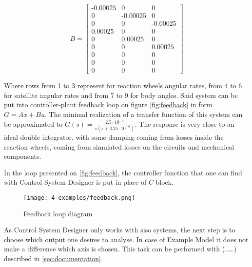         \small
        \begin{equation}
            B = 
            \begin{bmatrix}
                \text{-}0.00025  &           0 &            0 \\
                       0  &     \text{-}0.00025 &            0 \\
                       0  &           0 &      \text{-}0.00025 \\
                 0.00025  &           0 &            0 \\
                       0  &     0.00025 &            0 \\
                       0  &           0 &      0.00025 \\
                       0  &           0 &            0 \\
                       0  &           0 &            0 \\
                       0  &           0 &            0
            \end{bmatrix}
        \end{equation}
        \normalsize
    
        Where rows from 1 to 3 represent for reaction wheels angular rates, from 4 to 6 for satellite angular rates and from 7 to 9 for body angles. Said system can be put into controller-plant feedback loop on figure \autoref{fig:feedback} in form $G = Ax + Bu$. The minimal realization of a transfer function of this system can be approximated to $G(s) = \frac{2.5\cdot10^{-4}}{s(s+3.25\cdot10^{-6})}$. The response is very close to an ideal double integrator, with some damping coming from losses inside the reaction wheels, coming from simulated losses on the circuits and mechanical components. 
        
        In the loop presented on \autoref{fig:feedback}, the controller function that one can find with Control System Designer is put in place of $C$ block.

        \begin{figure}[H]
            \centering
            \texttt{[image: 4-examples/feedback.png]}
            \caption{Feedback loop diagram}
            \label{fig:feedback}
        \end{figure}

        As Control System Designer only works with \ac{siso} systems, the next step is to choose which output one desires to analyse. In case of Example Model it does not make a difference which axis is chosen. This task can be performed with (\dots\dots) described in \autoref{sec:documentation}.
        
